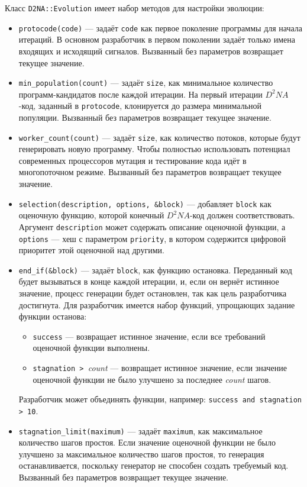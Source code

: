 \documentclass[utf8,a5paper,portrait,12pt]{eskdtext}
\begin{document}
Класс \texttt{D2NA::Evolution} имеет набор методов для настройки эволюции:
\begin{itemize}
  \item \texttt{protocode(code)} — задаёт \texttt{code} как первое поколение
        программы для начала итераций. В основном разработчик в первом поколении
        задаёт только имена входящих и исходящий сигналов.
        Вызванный без параметров возвращает текущее значение.
  \item \texttt{min\_population(count)} — задаёт \texttt{size}, как минимальное
        количество программ-кандидатов после каждой итерации. На первый итерации
        $D^2NA$-код, заданный в \texttt{protocode}, клонируется до размера
        минимальной популяции.
        Вызванный без параметров возвращает текущее значение.
  \item \texttt{worker\_count(count)} — задаёт \texttt{size}, как количество
        потоков, которые будут генерировать новую программу. Чтобы полностью
        использовать потенциал современных процессоров мутация и тестирование
        кода идёт в многопоточном режиме.
        Вызванный без параметров возвращает текущее значение.
  \item \texttt{selection(description, options, \&block)} — добавляет
        \texttt{block} как оценочную функцию, которой конечный $D^2NA$-код
        должен соответствовать. Аргумент \texttt{description} может содержать
        описание оценочной функции, а \texttt{options} — хеш с параметром
        \texttt{priority}, в котором содержится цифровой приоритет этой
        оценочной над другими.
  \item \texttt{end\_if(\&block)} — задаёт \texttt{block}, как функцию
        остановка. Переданный код будет вызываться в конце каждой итерации, и,
        если он вернёт истинное значение, процесс генерации будет остановлен,
        так как цель разработчика достигнута. Для разработчик имеется набор
        функций, упрощающих задание функции останова:
        \begin{itemize}
          \item \texttt{success} — возвращает истинное значение, если все
                требований оценочной функции выполнены.
          \item \texttt{stagnation > }\textit{count} — возвращает истинное
                значение, если значение оценочной функции не было улучшено за
                последнее \textit{count} шагов.
        \end{itemize}
        Разработчик может объединять функции, например:
        \texttt{success and stagnation > 10}.
  \item \texttt{stagnation\_limit(maximum)} — задаёт \texttt{maximum}, как
        максимальное количество шагов простоя. Если значение оценочной функции
        не было улучшено за максимальное количество шагов простоя, то генерация
        останавливается, поскольку генератор не способен создать требуемый код.
        Вызванный без параметров возвращает текущее значение.
\end{itemize}
\end{document}
